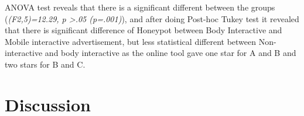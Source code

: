 \begin{table}[H]
\caption{Number of Honeypot effect in three weeks}
\label{tab:landingeffectthreeweeks}
\centering
{}
\end{table}


ANOVA test reveals that there is a significant different between the groups
(\emph{(F2,5)=12.29, p >.05 (p=.001)}), and after doing Post-hoc Tukey test it revealed that there is significant difference of Honeypot between Body Interactive and Mobile interactive advertisement, but less statistical different between Non-interactive and body interactive as the online tool gave one star for A and B and two stars for B and C.



\begin{table}[H]
\caption{Post-Hoc Tukey’s HSD results}
\label{tab:honeypot-non-posthoctukey}
\centering
{}
\end{table}



\section{Discussion}

